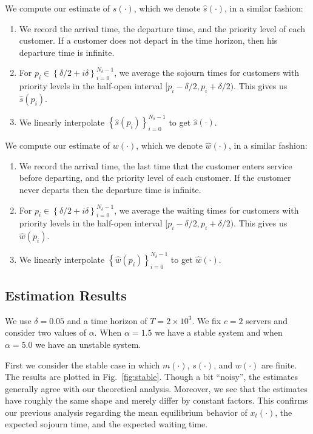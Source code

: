 \documentclass[conference]{IEEEtran}
\newcommand{\set}[1]{\left\{#1\right\}}
\begin{document}
We compute our estimate of $s(\cdot)$, which we denote $\hat
s(\cdot)$, in a similar fashion:
\begin{enumerate}
\item We record the arrival time, the departure time, and the priority
  level of each customer. If a customer does not depart in the time
  horizon, then his departure time is infinite.
\item For $p_i \in \set{\delta/2 + i\delta}_{i=0}^{N_\delta - 1}$, we
  average the sojourn times for customers with priority levels in the
  half-open interval $[p_i - \delta/2, p_i + \delta/2)$. This gives us
  $\hat s(p_i)$.
\item We linearly interpolate $\set{\hat s(p_i)}_{i=0}^{N_\delta - 1}$
  to get $\hat s(\cdot)$.
\end{enumerate}

We compute our estimate of $w(\cdot)$, which we denote $\hat
w(\cdot)$, in a similar fashion:
\begin{enumerate}
\item We record the arrival time, the last time that the customer
  enters service before departing, and the priority level of each
  customer. If the customer never departs then the departure time is
  infinite.
\item For $p_i \in \set{\delta/2 + i\delta}_{i=0}^{N_\delta - 1}$, we
  average the waiting times for customers with priority levels in the
  half-open interval $[p_i - \delta/2, p_i + \delta/2)$. This gives us
  $\hat w(p_i)$.
\item We linearly interpolate $\set{\hat w(p_i)}_{i=0}^{N_\delta - 1}$
  to get $\hat w(\cdot)$.
\end{enumerate}

\subsection{Estimation Results}
We use $\delta = 0.05$ and a time horizon of $T = 2 \times 10^3$. We
fix $c = 2$ servers and consider two values of $\alpha$. When $\alpha
= 1.5$ we have a stable system and when $\alpha = 5.0$ we have an
unstable system.

First we consider the stable case in which $m(\cdot)$, $s(\cdot)$, and
$w(\cdot)$ are finite. The results are plotted in
Fig.~\ref{fig:stable}. Though a bit ``noisy'', the estimates generally
agree with our theoretical analysis. Moreover, we see that the
estimates have roughly the same shape and merely differ by constant
factors. This confirms our previous analysis regarding the mean
equilibrium behavior of $x_t(\cdot)$, the expected sojourn time, and
the expected waiting time.
\end{document}
